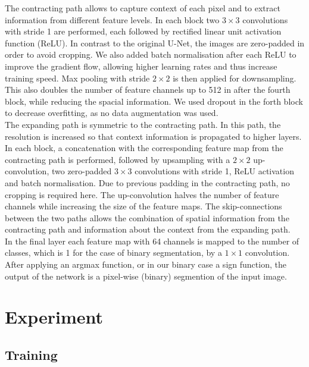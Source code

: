\documentclass[final]{article}
\begin{document}
The contracting path allows to capture context of each pixel and to extract information from different feature levels. In each block two $3 \times 3$ convolutions with stride 1 are performed, each followed by rectified linear unit activation function (ReLU). In contrast to the original U-Net, the images are zero-padded in order to avoid cropping. We also added batch normalisation after each ReLU to improve the gradient flow, allowing higher learning rates and thus increase training speed. Max pooling with stride $2 \times 2$ is then applied for downsampling. This also doubles the number of feature channels up to 512 in after the fourth block, while reducing the spacial information. We used dropout in the forth block to decrease overfitting, as no data augmentation was used.\\
The expanding path is symmetric to the contracting path. In this path, the resolution is increased so that context information is propagated to higher layers. In each block, a concatenation with the corresponding feature map from the contracting path is performed, followed by upsampling with a $2 \times 2$ up-convolution, two zero-padded $3\times 3$ convolutions with stride 1, ReLU activation and batch normalisation. Due to previous padding in the contracting path, no cropping is required here.  The up-convolution halves the number of feature channels while increasing the size of the feature maps. The skip-connections between the two paths allows the combination of spatial information from the contracting path and information about the context from the expanding path. 
\\
In the final layer each feature map with 64 channels is mapped to the number of classes, which is 1 for the case of binary segmentation, by a $1 \times 1$ convolution. \\
After applying an argmax function, or in our binary case a sign function, the output of the network is a pixel-wise (binary) segmention of the input image.

\section{Experiment}

\subsection{Training}
\end{document}
